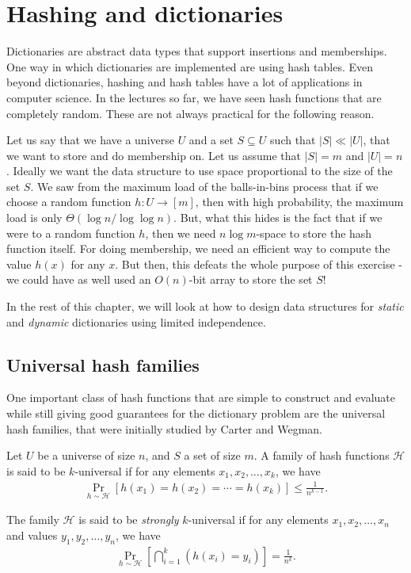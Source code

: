 \chapter{Hashing and dictionaries}

Dictionaries are abstract data types that support insertions and
memberships. One way in which dictionaries are implemented are using hash
tables. Even beyond dictionaries, hashing and hash tables have a lot of
applications in computer science. In the lectures so far, we have seen hash
functions that are completely random. These are not always practical for the
following reason.

Let us say that we have a universe $U$ and a set
$S \subseteq U$ such that $|S| \ll |U|$, that we want to
store and do membership on. Let us assume that $|S| = m$ and
$|U|=n$. Ideally we want the data structure to use space proportional
to the size of the set $S$. We saw from the maximum load of the balls-in-bins
process that if we choose a random function $h:U \to [m]$, then with
high probability, the maximum load is only $\Theta(\log n/\log\log n)$. But,
what this hides is the fact that if we were to a random function $h$, then we
need $n\log m$-space to store the hash function itself. For doing membership, we
need an efficient way to compute the value $h(x)$ for any $x$. But then, this
defeats the whole purpose of this exercise - we could have as well used an
$O(n)$-bit array to store the set $S$!

In the rest of this chapter, we will look at how to design data structures for
\emph{static} and \emph{dynamic} dictionaries using limited independence.

\section{Universal hash families}

One important class of hash functions that are simple to construct and evaluate
while still giving good guarantees for the dictionary problem are the universal
hash families, that were initially studied by Carter and Wegman.

\begin{definition}
  Let $U$ be a universe of size $n$, and $S$ a set of size $m$. A family of hash
  functions $\mathcal{H}$ is said to be $k$-universal if for any elements
  $x_1, x_2, \ldots, x_k$, we have
  \begin{align*}
    \Pr_{h \sim \mathcal{H}} \left[h(x_1) = h(x_2) = \cdots = h(x_k) \right] \leq \frac{1}{n^{k-1}}.
  \end{align*}

    The family $\mathcal{H}$ is said to be
  \emph{strongly} $k$-universal if for any elements $x_1, x_2, \ldots, x_n$ and
  values $y_1, y_2, \ldots, y_n$, we have
  \begin{align*}
    \Pr_{h\sim \mathcal{H}}\left[\bigcap_{i=1}^k (h(x_i) = y_i) \right] = \frac{1}{n^k}.
  \end{align*}
  \label{defn:univ-hash}
\end{definition}

